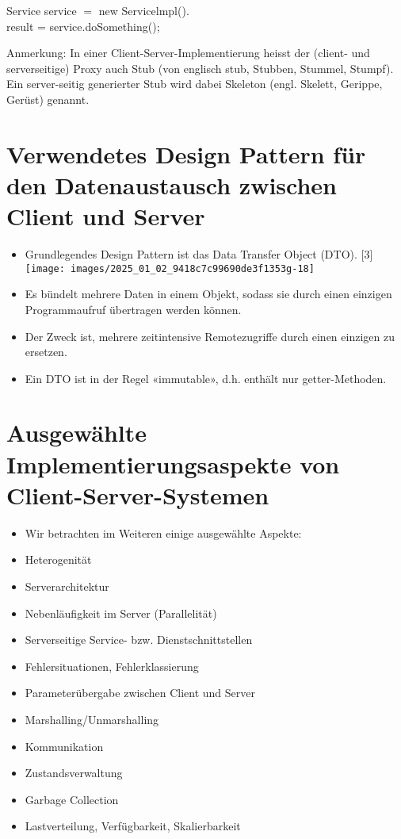 \documentclass[10pt]{article}
\begin{document}
Service service $=$ new Servicelmpl().\\
result = service.doSomething();

Anmerkung: In einer Client-Server-Implementierung heisst der (client- und serverseitige) Proxy auch Stub (von englisch stub, Stubben, Stummel, Stumpf). Ein server-seitig generierter Stub wird dabei Skeleton (engl. Skelett, Gerippe, Gerüst) genannt.

\section*{Verwendetes Design Pattern für den Datenaustausch zwischen Client und Server}
\begin{itemize}
  \item Grundlegendes Design Pattern ist das Data Transfer Object (DTO). [3]\\
\texttt{[image: images/2025\_01\_02\_9418c7c99690de3f1353g-18]}
  \item Es bündelt mehrere Daten in einem Objekt, sodass sie durch einen einzigen Programmaufruf übertragen werden können.
  \item Der Zweck ist, mehrere zeitintensive Remotezugriffe durch einen einzigen zu ersetzen.
  \item Ein DTO ist in der Regel «immutable», d.h. enthält nur getter-Methoden.
\end{itemize}

\section*{Ausgewählte Implementierungsaspekte von Client-Server-Systemen}
\begin{itemize}
  \item Wir betrachten im Weiteren einige ausgewählte Aspekte:
  \item Heterogenität
  \item Serverarchitektur
  \item Nebenläufigkeit im Server (Parallelität)
  \item Serverseitige Service- bzw. Dienstschnittstellen
  \item Fehlersituationen, Fehlerklassierung
  \item Parameterübergabe zwischen Client und Server
  \item Marshalling/Unmarshalling
  \item Kommunikation
  \item Zustandsverwaltung
  \item Garbage Collection
  \item Lastverteilung, Verfügbarkeit, Skalierbarkeit
\end{itemize}
\end{document}
